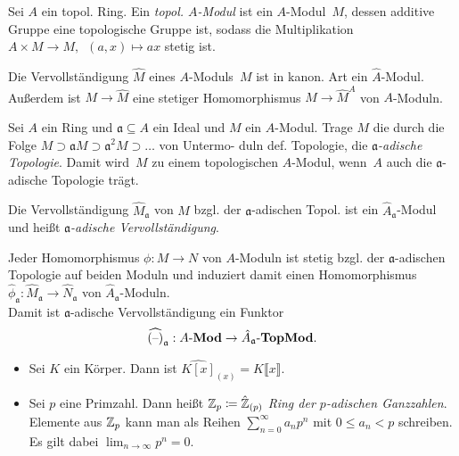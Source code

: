 \documentclass{cheat-sheet}
\newcommand{\Mod}{\mathbf{Mod}} %
\newcommand{\TopMod}{\mathbf{TopMod}} %
\newcommand{\LMod}[1]{{#1}\text{-}\Mod} %
\newcommand{\TopLMod}[1]{{#1}\text{-}\TopMod} %
\newcommand{\aaa}{\mathfrak{a}}
\begin{document}
\begin{defn}
  Sei $A$ ein topol. Ring.
  Ein \emph{topol. $A$-Modul} ist ein $A$-Modul~$M$, dessen additive Gruppe eine topologische Gruppe ist, sodass die Multiplikation $A \times M \to M, \enspace (a, x) \mapsto ax$ stetig ist.
\end{defn}

\begin{bem}
  Die Vervollständigung $\hat{M}$ eines $A$-Moduls~$M$ ist in kanon. Art ein $\hat{A}$-Modul.
  Außerdem ist $M \to \hat{M}$ eine stetiger Homomorphismus $M \to \hat{M}^A$ von $A$-Moduln.
\end{bem}

\begin{konstr}
  Sei $A$ ein Ring und $\aaa \subseteq A$ ein Ideal und $M$ ein $A$-Modul.
  Trage $M$ die durch die Folge $M \supset \aaa M \supset \aaa^2 M \supset \ldots$ von Untermo- duln def. Topologie, die \textit{$\aaa$-adische Topologie}.
  Damit wird~$M$ zu einem topologischen $A$-Modul, wenn~$A$ auch die $\aaa$-adische Topologie trägt.
\end{konstr}

\begin{defn}
  Die Vervollständigung $\hat{M}_\aaa$ von $M$ bzgl. der $\aaa$-adischen Topol. ist ein $\hat{A}_\aaa$-Modul und heißt \emph{$\aaa$-adische Vervollständigung}. %
\end{defn}

\begin{bem}
  Jeder Homomorphismus $\phi : M \to N$ von $A$-Moduln ist stetig bzgl. der $\aaa$-adischen Topologie auf beiden Moduln und induziert damit einen Homomorphismus $\hat{\phi}_\aaa : \hat{M}_\aaa \to \hat{N}_\aaa$ von $\hat{A}_\aaa$-Moduln. \\
  Damit ist $\aaa$-adische Vervollständigung ein Funktor
  \[
    \widehat{(\blank)}_\aaa : \LMod{A} \to \TopLMod{\hat{A}_\aaa}.
  \]
\end{bem}

\begin{bspe}
  \begin{itemize}
    \item Sei $K$ ein Körper.
    Dann ist $\widehat{K[x]}_{(x)} = K \llbracket x \rrbracket$.
    \item Sei $p$ eine Primzahl.
    Dann heißt $\mathbb{Z}_p \coloneqq \hat{\mathbb{Z}}_{(p)}$ \emph{Ring der $p$-adischen Ganzzahlen}.
    Elemente aus $\mathbb{Z}_p$ kann man als Reihen ${\sum}_{n=0}^\infty a_n p^n$ mit $0 \leq a_n < p$ schreiben.
    Es gilt dabei $\lim_{n \to \infty} p^n = 0$.
  \end{itemize}
\end{bspe}
\end{document}
